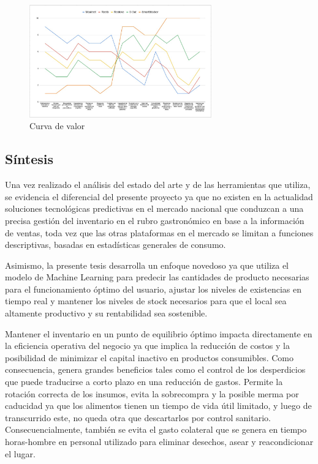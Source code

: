 \begin{figure}[htbp]
    \centering
    \includegraphics[width=0.7\textwidth]{images/curvaValor.jpeg}
    \caption{Curva de valor}
    \label{fig:curva}
\end{figure}

\FloatBarrier

\subsection{Síntesis}\label{sec:sintesis-estado}

Una vez realizado el análisis del estado del arte y de las herramientas que utiliza, se evidencia el diferencial del presente proyecto ya que no existen en la actualidad soluciones tecnológicas predictivas en el mercado nacional que conduzcan a una precisa gestión del inventario en el rubro gastronómico en base a la información de ventas, toda vez que las otras plataformas en el mercado se limitan a funciones descriptivas, basadas en estadísticas generales de consumo.

Asimismo, la presente tesis desarrolla un enfoque novedoso ya que utiliza el modelo de Machine Learning para predecir las cantidades de producto necesarias para el funcionamiento óptimo del usuario, ajustar los niveles de existencias en tiempo real y mantener los niveles de stock necesarios para que el local sea altamente productivo y su rentabilidad sea sostenible.

Mantener el inventario en un punto de equilibrio óptimo impacta directamente en la eficiencia operativa del negocio ya que implica la reducción de costos y la posibilidad de minimizar el capital inactivo en productos consumibles. Como consecuencia, genera grandes beneficios tales como el control de los desperdicios que puede traducirse a corto plazo en una reducción de gastos. Permite la rotación correcta de los insumos, evita la sobrecompra y la posible merma por caducidad ya que los alimentos tienen un tiempo de vida útil limitado, y luego de transcurrido este, no queda otra que descartarlos por control sanitario. Consecuencialmente, también se evita el gasto colateral que se genera en tiempo horas-hombre en personal utilizado para eliminar desechos, asear y reacondicionar el lugar.

